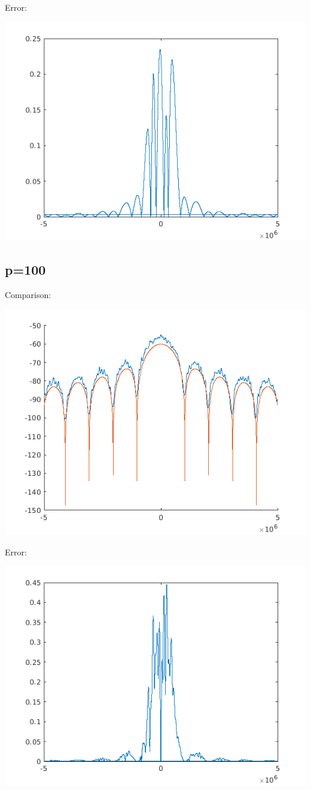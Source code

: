 \documentclass[conference,9pt]{IEEEtran}
\begin{document}
Error:

\includegraphics[scale=0.6]{earp10.png}

\subsection{p=100}
Comparison:

\includegraphics[scale=0.6]{arp100.png}

Error:

\includegraphics[scale=0.6]{earp100.png}
\end{document}

